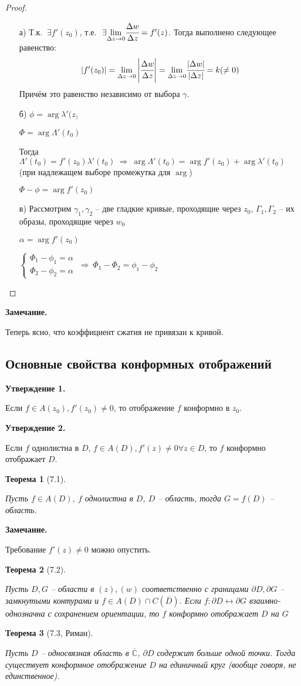 \documentclass[draft]{report}
\newcommand{\forcenewline}{$\phantom{\mbox{newline}}$\newline}
\newcommand{\dd}{\partial}
\newcommand{\then}{\ \Rightarrow\ }
\renewcommand{\C}{\mathbb{C}}
\newcommand{\mlim}[1]{\underset{#1}{\lim}}
\renewcommand{\bar}{\overline}
\renewcommand{\a}{\alpha}
\newcommand{\g}{\gamma}
\renewcommand{\f}{\phi}
\renewcommand{\l}{\lambda}
\newcommand{\D}{\Delta}
\newcommand{\E}{\ \exists}
\newcommand{\CC}{\bar{\C}}
\newcommand{\sys}[1]{\left\{\begin{matrix}#1\end{matrix}\right.}
\newtheorem*{theor}{Теорема}
\theoremstyle{remark}
\begin{document}
\begin{proof}
\forcenewline
\begin{enumerate}
\item[а)] Т.к. $\E f'(z_0)$, т.е. $\E \mlim{\D z\to0}\cfrac{\D w}{\D z}=f'(z)$. Тогда выполнено следующее равенство:
$$|f'(z_0)|=\mlim{\D z\to0}\left|\cfrac{\D w}{\D z}\right|=\mlim{\D z\to0}\cfrac{|\D w|}{|\D z|}=k(\neq0)$$
Причём это равенство независимо от выбора $\g$.
\item[б)] $\f=\arg \l'(z_)$

$\Phi=\arg\Lambda'(t_0)$

Тогда $\Lambda'(t_0)=f'(z_0)\l'(t_0)\then\arg\Lambda'(t_0)=\arg f'(z_0)+\arg\l'(t_0)$ (при надлежащем выборе промежутка для $\arg$)

$\Phi-\f=\arg f'(z_0)$
\item[в)] Рассмотрим $\g_1,\g_2$ -- две гладкие кривые, проходящие через $z_0$, $\Gamma_1,\Gamma_2$ -- их образы, проходящие через $w_0$

$\a=\arg f'(z_0)$

$\sys{\Phi_1-\f_1=\a \\ \Phi_2-\f_2=\a } \then \Phi_1-\Phi_2=\f_1-\f_2$
\end{enumerate}
\end{proof}

{\bfseries Замечание.}

Теперь ясно, что коэффициент сжатия не привязан к кривой.

\subsection{Основные свойства конформных отображений}

{\bfseries Утверждение 1.}

Если $f\in A(z_0), f'(z_0)\neq 0$, то отображение $f$ конформно в $z_0$.

{\bfseries Утверждение 2.}

Если $f$ однолистна в $D$, $f\in A(D), f'(z)\neq0 \forall z\in D$, то $f$ конформно отображает $D$.

\begin{theor}[7.1]
\forcenewline

Пусть $f\in A(D),\ f$ однолистна в $D$, $D$ -- область, тогда $G=f(D)$ -- область.
\end{theor}
{\bfseries Замечание.}

Требование $f'(z)\neq0$ можно опустить.
\begin{theor}[7.2]
\forcenewline

Пусть $D,G$ -- области в $(z), (w)$ соответственно с границами $\dd D, \dd G$ -- замкнутыми контурами и $f\in A(D)\cap C(\bar{D})$. Если $f\colon \dd D\leftrightarrow \dd G$ взаимно-однозначна с сохранением ориентации, то $f$ конформно отображает $D$ на $G$
\end{theor}
\begin{theor}[7.3, Риман]
\forcenewline

Пусть $D$ -- односвязная область в $\CC$, $\dd D$ содержит больше одной точки. Тогда существует конформное отображение $D$ на единичный круг (вообще говоря, не единственное).
\end{theor}
\end{document}
